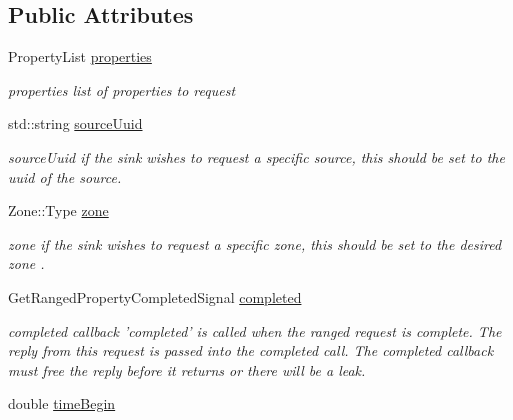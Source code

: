 \subsection*{Public Attributes}
\begin{DoxyCompactItemize}
\item 
\hypertarget{classAsyncRangePropertyRequest_afd6f95a06376fef905faf5ab1b580bc9}{Property\+List \hyperlink{classAsyncRangePropertyRequest_afd6f95a06376fef905faf5ab1b580bc9}{properties}}\label{classAsyncRangePropertyRequest_afd6f95a06376fef905faf5ab1b580bc9}

\begin{DoxyCompactList}\small\item\em properties list of properties to request \end{DoxyCompactList}\item 
\hypertarget{classAsyncRangePropertyRequest_a626258d5d401e0598d619b84600689f9}{std\+::string \hyperlink{classAsyncRangePropertyRequest_a626258d5d401e0598d619b84600689f9}{source\+Uuid}}\label{classAsyncRangePropertyRequest_a626258d5d401e0598d619b84600689f9}

\begin{DoxyCompactList}\small\item\em source\+Uuid if the sink wishes to request a specific source, this should be set to the uuid of the source. \end{DoxyCompactList}\item 
\hypertarget{classAsyncRangePropertyRequest_a045f1320e9152de5e97f0b4de5c061da}{Zone\+::\+Type \hyperlink{classAsyncRangePropertyRequest_a045f1320e9152de5e97f0b4de5c061da}{zone}}\label{classAsyncRangePropertyRequest_a045f1320e9152de5e97f0b4de5c061da}

\begin{DoxyCompactList}\small\item\em zone if the sink wishes to request a specific zone, this should be set to the desired zone . \end{DoxyCompactList}\item 
\hypertarget{classAsyncRangePropertyRequest_a81777a8e0304bd6929c05d39c650454d}{Get\+Ranged\+Property\+Completed\+Signal \hyperlink{classAsyncRangePropertyRequest_a81777a8e0304bd6929c05d39c650454d}{completed}}\label{classAsyncRangePropertyRequest_a81777a8e0304bd6929c05d39c650454d}

\begin{DoxyCompactList}\small\item\em completed callback 'completed' is called when the ranged request is complete. The reply from this request is passed into the completed call. The completed callback must free the reply before it returns or there will be a leak. \end{DoxyCompactList}\item 
\hypertarget{classAsyncRangePropertyRequest_a2dc2927f6c771707f15a767358a58e69}{double \hyperlink{classAsyncRangePropertyRequest_a2dc2927f6c771707f15a767358a58e69}{time\+Begin}}\label{classAsyncRangePropertyRequest_a2dc2927f6c771707f15a767358a58e69}


\end{DoxyCompactItemize}
